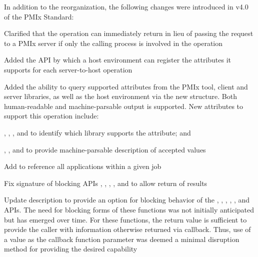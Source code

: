 In addition to the reorganization, the following changes were introduced in v4.0 of the PMIx Standard:

\begin{compactitemize}
    \item Clarified that the  operation can immediately return  in lieu of passing the request to a \ac{PMIx} server if only the calling process is involved in the operation
    \item Added the  \ac{API} by which a host environment can register the attributes it supports for each server-to-host operation
    \item Added the ability to query supported attributes from the \ac{PMIx} tool, client and server libraries, as well as the host environment via the new  structure. Both human-readable and machine-parsable output is supported. New attributes to support this operation include:
    \begin{compactitemize}
        \item {}, , , and  to identify which library supports the attribute; and
        \item {}, , and  to provide machine-parsable description of accepted values
    \end{compactitemize}
    \item Add  to reference all applications within a given job
    \item Fix signature of blocking APIs , , , , and  to allow return of results
    \item Update description to provide an option for blocking behavior of the , , , , , and  APIs. The need for blocking forms of these functions was not initially anticipated but has emerged over time. For these functions, the return value is sufficient to provide the caller with information otherwise returned via callback. Thus, use of a  value as the callback function parameter was deemed a minimal disruption method for providing the desired capability

\end{compactitemize}
